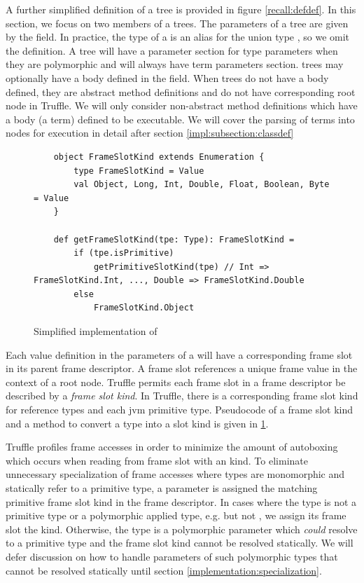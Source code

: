 A further simplified definition of a  tree is provided in figure \ref{recall:defdef}.
In this section, we focus on two members of a  trees.
The parameters of a  tree are given by the  field.
In practice, the type of a  is an alias for the union type , so we omit the  definition.
A  tree will have a parameter section for type parameters when they are polymorphic and will always have term parameters section.
 trees may optionally have a body defined in the  field.
When trees do not have a body defined, they are abstract method definitions and do not have  corresponding root node in Truffle.
We will only consider non-abstract method definitions which have a body (a term) defined to be executable.
We will cover the parsing of terms into nodes for execution in detail after section \ref{impl:subsection:classdef}

\begin{figure}[!htb]
	\begin{verbatim}
	object FrameSlotKind extends Enumeration {
		type FrameSlotKind = Value
		val Object, Long, Int, Double, Float, Boolean, Byte = Value
	}	
		
	def getFrameSlotKind(tpe: Type): FrameSlotKind = 
		if (tpe.isPrimitive) 
			getPrimitiveSlotKind(tpe) // Int => FrameSlotKind.Int, ..., Double => FrameSlotKind.Double
		else  
			FrameSlotKind.Object
	\end{verbatim}
	\caption{Simplified implementation of }
	\label{impl:frameslot-kind}
\end{figure}

Each value definition in the parameters of a  will have a corresponding frame slot in its parent frame descriptor. 
A frame slot references a unique frame value in the context of a root node.
Truffle permits each frame slot in a frame descriptor be described by a \textit{frame slot kind}.
In Truffle, there is a corresponding frame slot kind for reference types and each \acrshort{jvm} primitive type. 
Pseudocode of a frame slot kind and a method to convert a type into a slot kind is given in \ref{impl:frameslot-kind}.

Truffle profiles frame accesses in order to minimize the amount of autoboxing which occurs when reading from frame slot with an  kind. 
To eliminate unnecessary specialization of frame accesses where types are monomorphic and statically refer to a primitive type, a parameter is assigned the matching primitive frame slot kind in the frame descriptor. 
In cases where the type is not a primitive type or a polymorphic applied type, e.g.  but not , we assign its frame slot the  kind.
Otherwise, the type is a polymorphic parameter which \textit{could} resolve to a primitive type and the frame slot kind cannot be resolved statically.
We will defer discussion on how to handle parameters of such polymorphic types that cannot be resolved statically until section \ref{implementation:specialization}.

